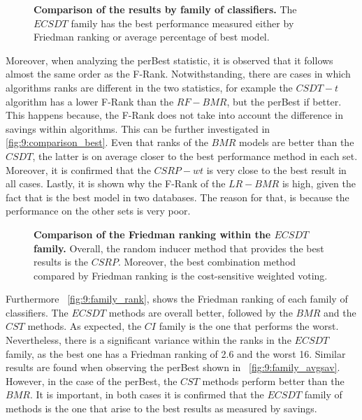 {\begin{figure}[!t]
  \centering
  \hfil
  \caption{\textbf{Comparison of the results by family of classifiers.} The $ECSDT$ family has the 
  best performance measured either by Friedman ranking or average percentage of best model.}
  \label{fig:9:comparison_family}
\end{figure}

  Moreover, when analyzing the perBest statistic, it is observed that it follows almost the same 
  order as the F-Rank. Notwithstanding, there are cases in which algorithms ranks are different in 
  the two statistics, for example the $CSDT-t$ algorithm has a lower F-Rank than the $RF-BMR$, 
  but the perBest if better. This happens because, the F-Rank does not take into account the 
  difference in savings within algorithms. This can be further investigated in \figurename{ 
  \ref{fig:9:comparison_best}}. Even that ranks of the $BMR$ models are better than the $CSDT$, the 
  latter is on average closer to the best performance method in each set. Moreover, it is confirmed 
  that the $CSRP-wt$ is very close to the best result in all cases. Lastly, it is shown why the 
  F-Rank of the $LR-BMR$ is high, given the fact that is the best model in two databases. The 
  reason  for that, is because the performance on the other sets is very poor.

   \begin{figure}[!t]
  \centering
  \hfil
  \caption{\textbf{Comparison of the Friedman ranking within the $ECSDT$ family.} Overall, the 
  random inducer method that provides the best results is the $CSRP$. Moreover, the best 
  combination method compared by Friedman ranking is the cost-sensitive weighted voting.}
  \label{fig:9:rank_ecsdt}
\end{figure}

  Furthermore \figurename{~\ref{fig:9:family_rank}}, shows the Friedman ranking of each family of 
  classifiers. The $ECSDT$ methods are overall better, followed by the $BMR$ and the $CST$ methods. 
  As expected, the $CI$ family is the one that performs the worst. Nevertheless, there is 
  a significant variance within the ranks in the $ECSDT$ family, as the best one has a Friedman 
  ranking of 2.6 and the worst 16. Similar results are found when observing the perBest shown in 
  \figurename{~\ref{fig:9:family_avgsav}}. However, in the case of the perBest, the $CST$ methods 
  perform better than the $BMR$. It is important, in both cases it is confirmed that the $ECSDT$ 
  family of methods is the one that arise to the best results as measured by savings.
  
}
